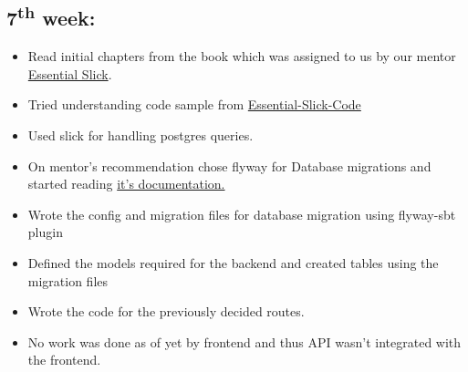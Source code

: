 \documentclass{article}
\begin{document}
  \subsection*{7\textsuperscript{th} week:}
\begin{itemize}

    \item Read initial chapters from the book which was assigned to us by our mentor \href{http://underscore.io/books/essential-slick/}{Essential Slick}.
    \item Tried understanding code sample from \href{https://github.com/abhayptp/essential-slick-code}{Essential-Slick-Code}
   
    \item Used slick for handling postgres queries.
  \item On mentor's recommendation chose flyway for Database migrations and started reading \href{https://flywaydb.org/getstarted/firststeps/commandline}{it's documentation.}
 
 
    \item Wrote the config and migration files for database migration using flyway-sbt plugin
    \item Defined the models required for the backend and created tables using the migration files
    \item Wrote the code for the previously decided routes.
\item No work was done as of yet by frontend and thus API wasn't integrated with the frontend.

\end{itemize}
\end{document}
